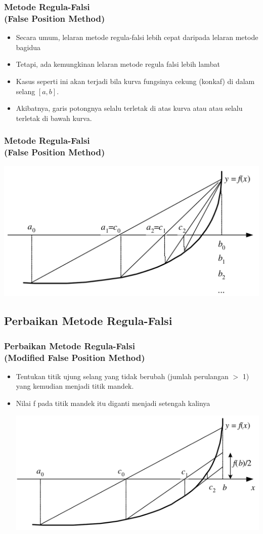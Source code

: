 \documentclass[pdflatex,compress]{beamer}
\begin{document}
\begin{frame}
	\frametitle{Metode Regula-Falsi\\(False Position Method)}
	\begin{itemize}
		\item Secara umum, lelaran metode regula-falsi lebih cepat daripada lelaran metode bagidua
		\item Tetapi, ada kemungkinan lelaran metode regula falsi lebih lambat
		\item Kasus seperti ini akan terjadi bila kurva fungsinya cekung (konkaf) di dalam selang $ [a, b] $.
		\item Akibatnya, garis potongnya selalu terletak di atas kurva atau atau selalu terletak di bawah kurva.
	\end{itemize}
\end{frame}

\begin{frame}
	\frametitle{Metode Regula-Falsi\\(False Position Method)}
	\begin{center}
		\includegraphics[width=0.6\linewidth]{img/img11}
	\end{center}
\end{frame}

\subsection{Perbaikan Metode Regula-Falsi}
\begin{frame}
	\frametitle{Perbaikan Metode Regula-Falsi \\ (Modified False Position Method)}
	\begin{itemize}
		\item Tentukan titik ujung selang yang tidak berubah (jumlah perulangan $ > $ 1) yang kemudian menjadi titik mandek.
		\item Nilai f pada titik mandek itu diganti menjadi setengah kalinya
		\begin{center}
			\includegraphics[height=0.5\textheight]{img/img12}
		\end{center}
	\end{itemize}
\end{frame}
\end{document}
